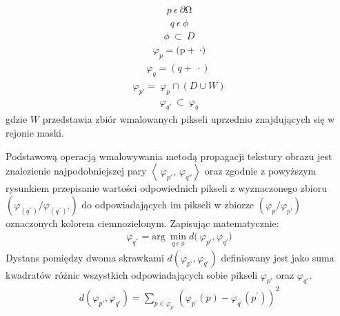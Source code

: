 \documentclass[12pt, twoside, openany]{report}
\theoremstyle{definition}
\begin{document}
\begin{align}
p\ \epsilon \ \partial \mathrm{\Omega }
\end{align}
\begin{align}
q\ \epsilon \mathrm{\ }\phi 
\end{align}
\begin{align}
\phi \ \subset \ D
\end{align}
\begin{align}
{\varphi }_p=\mathrm{(p+\ }\mathrm{\cdot }\mathrm{)}
\end{align}
\begin{align}
{\varphi }_q=(q+\ \cdot )\ 
\end{align}
\begin{align}
{\varphi }_{p'}=\ {\varphi }_p\cap (D\cup W) 
\end{align}
\begin{align}
{\varphi }_{q'}\ \subset \ {\varphi }_q
\end{align}
gdzie $W$ przedstawia zbiór wmalowanych pikseli uprzednio znajdujących się w rejonie maski.
\par
Podstawową operacją wmalowywania metodą propagacji tekstury obrazu jest znalezienie najpodobniejszej pary $\left\langle {\ \varphi }_{p'},\ {\varphi }_{q''}\right\rangle $ oraz zgodnie z powyższym rysunkiem przepisanie wartości odpowiednich pikseli z wyznaczonego zbioru $({\varphi }_{(q^{''})}/{\varphi }_{(q^{''})'})$ do odpowiadających im pikseli w zbiorze $({\varphi }_p/{\varphi }_{p'})$ oznaczonych kolorem ciemnozielonym. Zapisując matematycznie:
\begin{align}
{\varphi }_{q^{''}}={\mathrm{arg}\ \mathop{\mathrm{min}}_{q\ \epsilon \mathrm{\ }\phi } d(\ }{\varphi }_{p'},{\varphi }_{q'})
\label{FROBDIST}
\end{align}
Dystans pomiędzy dwoma skrawkami $d({\varphi }_{p'},{\varphi }_{q'})$ definiowany jest jako suma kwadratów różnic wszystkich odpowiadających sobie pikseli ${\varphi }_{p'}$ oraz ${\varphi }_{q'}$.
\begin{align}
d(\varphi_{p'},\varphi_{q'})= \sum_{p\in \varphi_{p'}} \left( \varphi_{p^{'}}(p) - \varphi _{q^{'}} \left(p^{'}\right) \right)^2
\label{FROBENIUS} 
\end{align}
\end{document}
